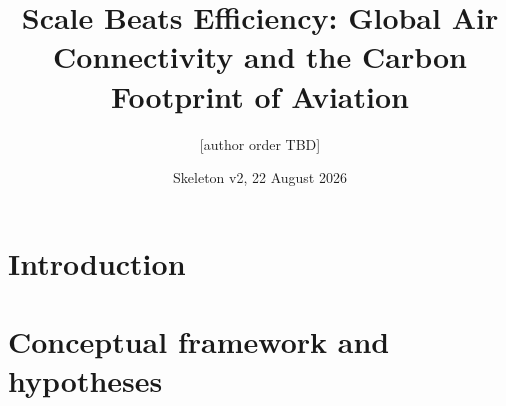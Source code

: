 \documentclass[12pt]{article}
\title{Scale Beats Efficiency: Global Air Connectivity and the Carbon
Footprint of Aviation}
\author{[author order TBD]}
\date{Skeleton v2, 22 August 2026}
\begin{document}
\maketitle

\section{Introduction}

\section{Conceptual framework and hypotheses}
\end{document}
